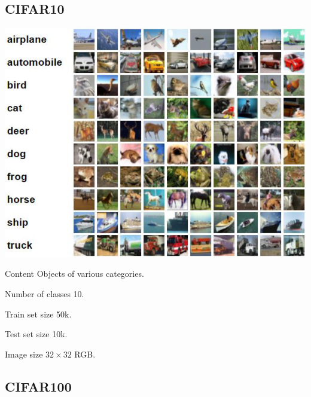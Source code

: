 \subsection{CIFAR10}

\begin{minipage}{0.45\linewidth}
    \centering
    \includegraphics[width=0.9\linewidth]{./img/cifar10.png}
\end{minipage}
\begin{minipage}{0.5\linewidth}
    \begin{descriptionlist}
        \item[Content] Objects of various categories.
        \item[Number of classes] 10.
        \item[Train set size] 50k.
        \item[Test set size] 10k.
        \item[Image size] $32 \times 32$ RGB.
    \end{descriptionlist}
\end{minipage}


\subsection{CIFAR100}

